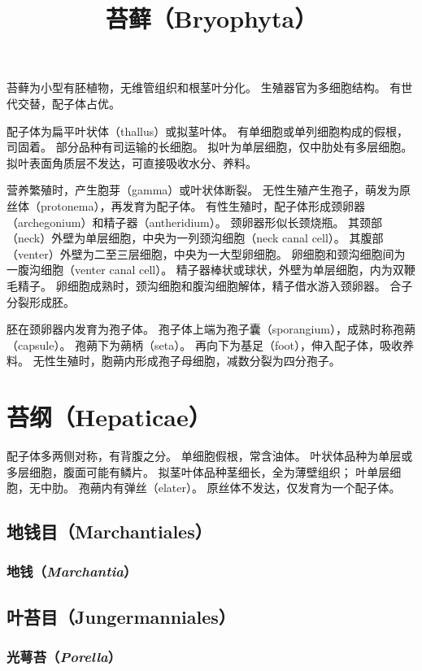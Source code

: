 \documentclass[11pt]{article}
\title{苔藓（Bryophyta）}
\date{}
\begin{document}
  \maketitle

  \linenumbers
苔藓为小型有胚植物，无维管组织和根茎叶分化。
生殖器官为多细胞结构。
有世代交替，配子体占优。

\newline

配子体为扁平叶状体（thallus）或拟茎叶体。
有单细胞或单列细胞构成的假根，司固着。
部分品种有司运输的长细胞。
拟叶为单层细胞，仅中肋处有多层细胞。
拟叶表面角质层不发达，可直接吸收水分、养料。

\newline

营养繁殖时，产生胞芽（gamma）或叶状体断裂。
无性生殖产生孢子，萌发为原丝体（protonema），再发育为配子体。
有性生殖时，配子体形成颈卵器（archegonium）和精子器（antheridium）。
颈卵器形似长颈烧瓶。
其颈部（neck）外壁为单层细胞，中央为一列颈沟细胞（neck canal cell）。
其腹部（venter）外壁为二至三层细胞，中央为一大型卵细胞。
卵细胞和颈沟细胞间为一腹沟细胞（venter canal cell）。
精子器棒状或球状，外壁为单层细胞，内为双鞭毛精子。
卵细胞成熟时，颈沟细胞和腹沟细胞解体，精子借水游入颈卵器。
合子分裂形成胚。

\newline

胚在颈卵器内发育为孢子体。
孢子体上端为孢子囊（sporangium），成熟时称孢蒴（capsule）。
孢蒴下为蒴柄（seta）。
再向下为基足（foot），伸入配子体，吸收养料。
无性生殖时，胞蒴内形成孢子母细胞，减数分裂为四分孢子。

\section{苔纲（Hepaticae）}
配子体多两侧对称，有背腹之分。
单细胞假根，常含油体。
叶状体品种为单层或多层细胞，腹面可能有鳞片。
拟茎叶体品种茎细长，全为薄壁组织；
叶单层细胞，无中肋。
孢蒴内有弹丝（elater）。
原丝体不发达，仅发育为一个配子体。

\subsection{地钱目（Marchantiales）}
\subsubsection{地钱（\textit{Marchantia}）}

\subsection{叶苔目（Jungermanniales）}
\subsubsection{光萼苔（\textit{Porella}）}

\section{}
\end{document}
